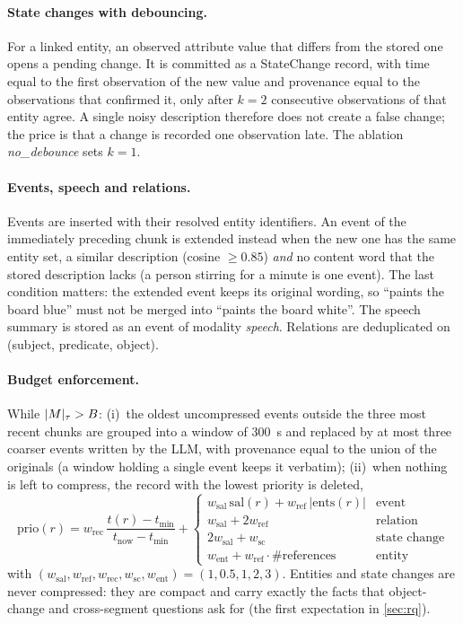 \paragraph{State changes with debouncing.}
For a linked entity, an observed attribute value that differs from the stored
one opens a pending change. It is committed as a StateChange record, with time
equal to the first observation of the new value and provenance equal to the
observations that confirmed it, only after $k=2$ consecutive observations of
that entity agree. A single noisy description therefore does not create a
false change; the price is that a change is recorded one observation late.
The ablation \emph{no\_debounce} sets $k=1$.

\paragraph{Events, speech and relations.}
Events are inserted with their resolved entity identifiers. An event of the
immediately preceding chunk is extended instead when the new one has the same
entity set, a similar description (cosine $\ge0.85$) \emph{and} no content
word that the stored description lacks (a person stirring for a minute is one
event). The last condition matters: the extended event keeps its original
wording, so ``paints the board blue'' must not be merged into ``paints the
board white''. The speech summary is stored as an event of
modality \emph{speech}. Relations are deduplicated on
(subject, predicate, object).

\paragraph{Budget enforcement.}
While $\lvert M \rvert_{\tau}>B$: (i)~the oldest uncompressed events outside the three
most recent chunks are grouped into a window of 300~s and replaced by at most
three coarser events written by the LLM, with provenance equal to the union of
the originals (a window holding a single event keeps it verbatim); (ii)~when nothing is left to compress, the record with the
lowest priority is deleted,
\[
\mathrm{prio}(r)=w_{\mathrm{rec}}\,\frac{t(r)-t_{\min}}{t_{\mathrm{now}}-t_{\min}}
+\begin{cases}
w_{\mathrm{sal}}\,\mathrm{sal}(r)+w_{\mathrm{ref}}\,|\mathrm{ents}(r)| & \text{event}\\
w_{\mathrm{sal}}+2w_{\mathrm{ref}} & \text{relation}\\
2w_{\mathrm{sal}}+w_{\mathrm{sc}} & \text{state change}\\
w_{\mathrm{ent}}+w_{\mathrm{ref}}\cdot\#\text{references} & \text{entity}
\end{cases}
\]
with $(w_{\mathrm{sal}},w_{\mathrm{ref}},w_{\mathrm{rec}},w_{\mathrm{sc}},w_{\mathrm{ent}})=(1,0.5,1,2,3)$.
Entities and state changes are never compressed: they are compact and carry
exactly the facts that object-change and cross-segment questions ask for
(the first expectation in \cref{sec:rq}).

